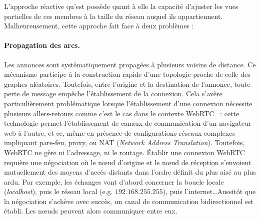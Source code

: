 L'approche réactive qu'est \SCAMP possède quant à elle la capacité d'ajuster les
vues partielles de ces membres à la taille du réseau auquel ils
appartiennent. Malheureusement, cette approche fait face à deux problèmes :

\paragraph{Propagation des arcs.} Les annonces sont systématiquement propagées à
plusieurs voisins de distance. Ce mécanisme participe à la construction rapide
d'une topologie proche de celle des graphes aléatoires. Toutefois, entre
l'origine et la destination de l'annonce, toute perte de message empêche
l'établissement de la connexion. Cela s'avère particulièrement problématique
lorsque l'établissement d'une connexion nécessite plusieurs allers-retours comme
c'est le cas dans le contexte WebRTC~\cite{webrtc} : 
cette technologie permet l'établissement de canaux de
communication d'un navigateur web à l'autre, et ce, même en présence de
configurations réseaux complexes impliquant pare-feu, proxy, ou NAT
(\emph{Network Address Translation}). Toutefois, WebRTC ne gère ni l'adressage,
ni le routage.  Établir une connexion WebRTC requière une négociation où le nœud
d'origine et le nœud de réception s'envoient mutuellement des moyens d'accès
distants dans l'ordre définit du plus aisé au plus ardu. Par exemple, les
échanges vont d'abord concerner la boucle locale (\emph{localhost}), puis le
réseau local (e.g. $192.168.255.255$), puis l'internet\ldots Aussitôt que la
négociation s'achève avec succès, un canal de communication bidirectionnel est
établi. Les nœuds peuvent alors communiquer entre eux.

